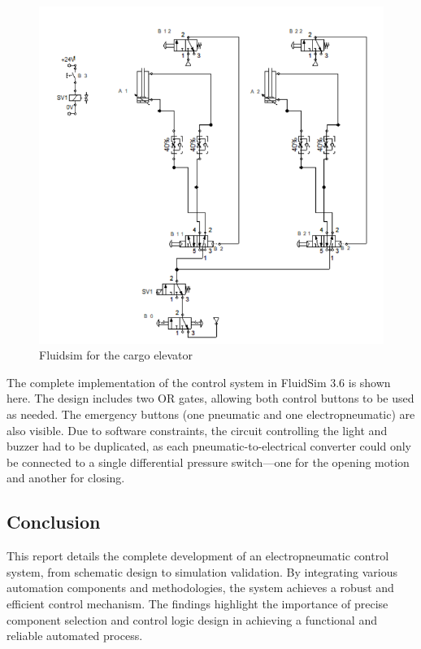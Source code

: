 \begin{figure}[H]
    \includegraphics[width=16cm]{Images/Q4/fluidsim.png}
    \centering
    \caption{Fluidsim for the cargo elevator}
    \label{fig:fluidsim}
\end{figure}

The complete implementation of the control system in FluidSim 3.6 is shown here. The design includes two OR gates, 
allowing both control buttons to be used as needed. The emergency buttons (one pneumatic and one electropneumatic) 
are also visible. Due to software constraints, the circuit controlling the light and buzzer had to be duplicated, as 
each pneumatic-to-electrical converter could only be connected to a single differential pressure switch—one for the 
opening motion and another for closing.\\

\subsection{Conclusion}

This report details the complete development of an electropneumatic control system, from schematic 
design to simulation validation. By integrating various automation components and methodologies, 
the system achieves a robust and efficient control mechanism. The findings highlight the importance 
of precise component selection and control logic design in achieving a functional and reliable 
automated process.